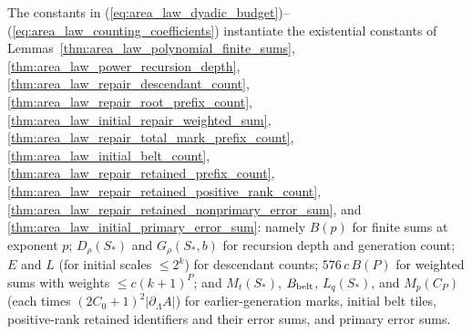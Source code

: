\begin{lemma}
    \label{thm:area_law_two_family_counting_coefficients}
    \leanok
    The constants in (\ref{eq:area_law_dyadic_budget})--(\ref{eq:area_law_counting_coefficients})
    instantiate the existential constants of
    Lemmas~\ref{thm:area_law_polynomial_finite_sums},
    \ref{thm:area_law_power_recursion_depth},
    \ref{thm:area_law_repair_descendant_count},
    \ref{thm:area_law_repair_root_prefix_count},
    \ref{thm:area_law_initial_repair_weighted_sum},
    \ref{thm:area_law_repair_total_mark_prefix_count},
    \ref{thm:area_law_initial_belt_count},
    \ref{thm:area_law_repair_retained_prefix_count},
    \ref{thm:area_law_repair_retained_positive_rank_count},
    \ref{thm:area_law_repair_retained_nonprimary_error_sum}, and
    \ref{thm:area_law_initial_primary_error_sum}: namely $B(p)$ for finite sums
    at exponent $p$; $D_\rho(S_*)$ and $G_\rho(S_*,b)$ for recursion depth and
    generation count; $E$ and $L$ (for initial scales $\le 2^k$) for descendant
    counts; $576\,c\,B(P)$ for weighted sums with weights $\le c(k+1)^P$; and
    $M_t(S_*)$, $B_{\rm belt}$, $L_q(S_*)$, and $M_p(C_P)$ (each times
    $(2C_0+1)^2|\partial_\Lambda A|$) for earlier-generation marks, initial
    belt tiles, positive-rank retained identifiers and their error sums, and
    primary error sums.
\end{lemma}

